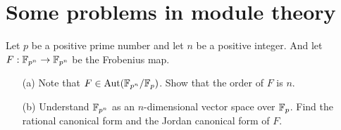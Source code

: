 \section{Some problems in module theory}

\begin{prob}
    Let $p$ be a positive prime number and let $n$ be a positive integer.
    And let $F: {\mathbb{F}}_{p^n}\rightarrow{\mathbb{F}}_{p^n}$ be the Frobenius map.
    \begin{enumerate}
        \item[(a)]
        {
            Note that $F\in{\textrm{Aut}({{\mathbb{F}}_{p^n}/{\mathbb{F}}_p})}$.
            Show that the order of $F$ is $n$.
        }
        \item[(b)]
        {
            Understand ${\mathbb{F}}_{p^n}$ as an $n$-dimensional vector space over ${\mathbb{F}}_p$.
            Find the rational canonical form and the Jordan canonical form of $F$.
        }
    \end{enumerate}
\end{prob}
